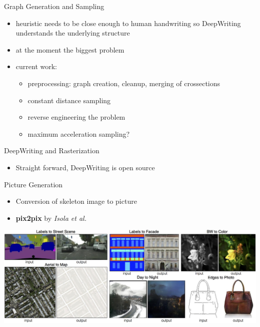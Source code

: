 \documentclass[aspectratio=169]{beamer}
\begin{document}
\begin{frame}{Graph Generation and Sampling}
\begin{itemize}
\item heuristic needs to be close enough to human handwriting so DeepWriting understands the underlying structure
\item at the moment the biggest problem
\item current work:
	\begin{itemize}
	\item preprocessing: graph creation, cleanup, merging of crossections
	\item constant distance sampling
	\item reverse engineering the problem
	\item maximum acceleration sampling?
	\end{itemize}
\end{itemize}
\end{frame}

\begin{frame}{DeepWriting and Rasterization}
\begin{itemize}
\item Straight forward, DeepWriting is open source
\end{itemize}
\end{frame}

\begin{frame}{Picture Generation}
\begin{itemize}
\item Conversion of skeleton image to picture
\item \textbf{pix2pix} by \emph{Isola et al.}
\end{itemize}
\begin{center}
\includegraphics[scale=0.18]{pics/pix2pix.jpg}
\end{center}
\end{frame}
\end{document}
